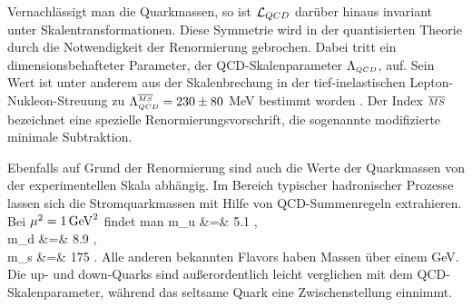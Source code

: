 Vernachl\"assigt man die Quarkmassen, so ist ${\cal L}_{QCD}$ dar\"uber 
hinaus invariant unter Skalentransformationen. Diese Symmetrie wird in 
der quantisierten Theorie durch die Notwendigkeit der Renormierung
gebrochen. Dabei tritt ein dimensionsbehafteter Parameter, der
QCD-Skalenparameter $\Lambda_{\scriptscriptstyle QCD}$, auf. Sein Wert ist unter anderem 
aus der Skalenbrechung in der tief-inelastischen Lepton-Nukleon-Streuung zu
$\Lambda_{\scriptscriptstyle QCD}^{\scriptscriptstyle\overline{MS}} =230\pm 80$ MeV bestimmt worden
\cite{PDG90}. Der Index ${\scriptstyle \overline{MS}}$ bezeichnet eine spezielle
Renormierungsvorschrift, die sogenannte modifizierte minimale 
Subtraktion.

Ebenfalls auf Grund der Renormierung sind  auch die Werte der 
Quarkmassen von der experimentellen Skala abh\"angig.
Im Bereich typischer hadronischer Prozesse lassen sich 
die Stromquarkmassen mit Hilfe von QCD-Summenregeln 
extrahieren. Bei $\mu^2=1\,{\rm GeV}^2$ findet man
\cite{GL82,DR87}
\beq
   m_u &=& 5.1  , \nonumber  \\
   m_d &=& 8.9  , \\
   m_s &=& 175  .  \nonumber
\eeq   
Alle anderen bekannten Flavors haben Massen \"uber einem GeV. Die
up- und down-Quarks sind au\ss erordentlich leicht verglichen mit dem
QCD-Skalenparameter, w\"ahrend das seltsame Quark eine Zwischenstellung
einnimmt.   

